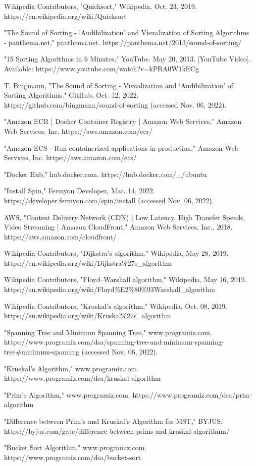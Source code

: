 \begin{thebibliography}{9}
Wikipedia Contributors, "Quicksort," Wikipedia, Oct. 23, 2019. https://en.wikipedia.org/wiki/Quicksort

"The Sound of Sorting - 'Audibilization' and Visualization of Sorting Algorithms - panthema.net," panthema.net. https://panthema.net/2013/sound-of-sorting/

"15 Sorting Algorithms in 6 Minutes," YouTube. May 20, 2013. [YouTube Video]. Available: https://www.youtube.com/watch?v=kPRA0W1kECg

T. Bingmann, "The Sound of Sorting - Visualization and ‘Audibilization’ of Sorting Algorithms," GitHub, Oct. 12, 2022. https://github.com/bingmann/sound-of-sorting (accessed Nov. 06, 2022).

"Amazon ECR | Docker Container Registry | Amazon Web Services," Amazon Web Services, Inc. https://aws.amazon.com/ecr/

"Amazon ECS - Run containerized applications in production," Amazon Web Services, Inc. https://aws.amazon.com/ecs/

"Docker Hub," hub.docker.com. https://hub.docker.com/\_/ubuntu

"Install Spin," Fermyon Developer, Mar. 14, 2022. https://developer.fermyon.com/spin/install (accessed Nov. 06, 2022).

AWS, "Content Delivery Network (CDN) | Low Latency, High Transfer Speeds, Video Streaming | Amazon CloudFront," Amazon Web Services, Inc., 2018. https://aws.amazon.com/cloudfront/

Wikipedia Contributors, "Dijkstra’s algorithm," Wikipedia, May 28, 2019. https://en.wikipedia.org/wiki/Dijkstra\%27s\_algorithm

Wikipedia Contributors, "Floyd–Warshall algorithm," Wikipedia, May 16, 2019. https://en.wikipedia.org/wiki/Floyd\%E2\%80\%93Warshall\_algorithm

Wikipedia Contributors, "Kruskal’s algorithm," Wikipedia, Oct. 08, 2019. https://en.wikipedia.org/wiki/Kruskal\%27s\_algorithm

"Spanning Tree and Minimum Spanning Tree," www.programiz.com. https://www.programiz.com/dsa/spanning-tree-and-minimum-spanning-tree\#minimum-spanning (accessed Nov. 06, 2022).

"Kruskal’s Algorithm," www.programiz.com. https://www.programiz.com/dsa/kruskal-algorithm

"Prim’s Algorithm," www.programiz.com. https://www.programiz.com/dsa/prim-algorithm

"Difference between Prim’s and Kruskal’s Algorithm for MST," BYJUS. https://byjus.com/gate/difference-between-prims-and-kruskal-algorithum/

"Bucket Sort Algorithm," www.programiz.com. https://www.programiz.com/dsa/bucket-sort
\end{thebibliography}